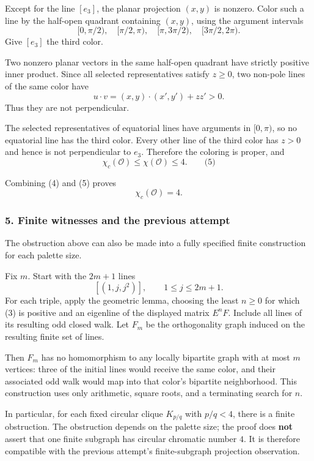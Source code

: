 \documentclass[
  11pt,
  a4paper,
]{article}
\begin{document}
Except for the line \([e_3]\), the planar projection \((x,y)\) is
nonzero. Color such a line by the half-open quadrant containing
\((x,y)\), using the argument intervals \[
[0,\pi/2),\quad [\pi/2,\pi),\quad
[\pi,3\pi/2),\quad [3\pi/2,2\pi).
\] Give \([e_3]\) the third color.

Two nonzero planar vectors in the same half-open quadrant have strictly
positive inner product. Since all selected representatives satisfy
\(z\ge0\), two non-pole lines of the same color have \[
u\cdot v
=(x,y)\cdot(x',y')+zz'>0.
\] Thus they are not perpendicular.

The selected representatives of equatorial lines have arguments in
\([0,\pi)\), so no equatorial line has the third color. Every other line
of the third color has \(z>0\) and hence is not perpendicular to
\(e_3\). Therefore the coloring is proper, and \[
\chi_c(\mathcal O)\le\chi(\mathcal O)\le4. \qquad\text{(5)}
\]

Combining (4) and (5) proves \[
\boxed{\chi_c(\mathcal O)=4}.
\]

\subsubsection{5. Finite witnesses and the previous
attempt}\label{finite-witnesses-and-the-previous-attempt}

The obstruction above can also be made into a fully specified finite
construction for each palette size.

Fix \(m\). Start with the \(2m+1\) lines \[
[(1,j,j^2)],\qquad 1\le j\le2m+1.
\] For each triple, apply the geometric lemma, choosing the least
\(n\ge0\) for which (3) is positive and an eigenline of the displayed
matrix \(E^nF\). Include all lines of its resulting odd closed walk. Let
\(F_m\) be the orthogonality graph induced on the resulting finite set
of lines.

Then \(F_m\) has no homomorphism to any locally bipartite graph with at
most \(m\) vertices: three of the initial lines would receive the same
color, and their associated odd walk would map into that color's
bipartite neighborhood. This construction uses only arithmetic, square
roots, and a terminating search for \(n\).

In particular, for each fixed circular clique \(K_{p/q}\) with
\(p/q<4\), there is a finite obstruction. The obstruction depends on the
palette size; the proof does \textbf{not} assert that one finite
subgraph has circular chromatic number \(4\). It is therefore compatible
with the previous attempt's finite-subgraph projection observation.
\end{document}
